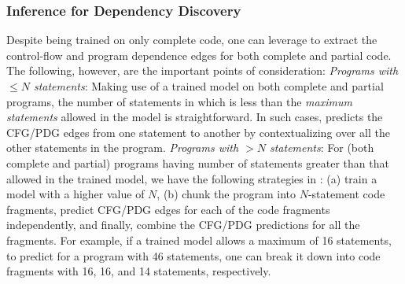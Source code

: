 \subsubsection{\bf Inference for Dependency Discovery}
\label{sec:inference}
Despite being trained on only complete code, one can leverage \tool to extract the control-flow and program dependence edges for both complete and partial code. The following, however, are the important points of consideration:
\textit{Programs with ${\leq}N$ statements}: Making use of a trained
\tool model on both complete and partial programs, the number of
statements in which is less than the \textit{maximum statements}
allowed in the model is straightforward. In such cases, \tool predicts
the CFG/PDG edges from one statement to another by contextualizing
over all the other statements in the program.
\textit{Programs with ${>}N$ statements}: For (both complete and
partial) programs having number of statements greater than that
allowed in the trained \tool model, we have the following strategies
in {\tool}: (a) train a model with a higher value of $N$, (b) chunk
the program into $N$-statement code fragments, predict CFG/PDG edges
for each of the code fragments independently, and finally, combine the
CFG/PDG predictions for all the fragments. For example, if a trained
model allows a maximum of 16 statements, to predict for a program with
46 statements, one can break it down into code fragments with 16, 16,
and 14 statements, respectively.


